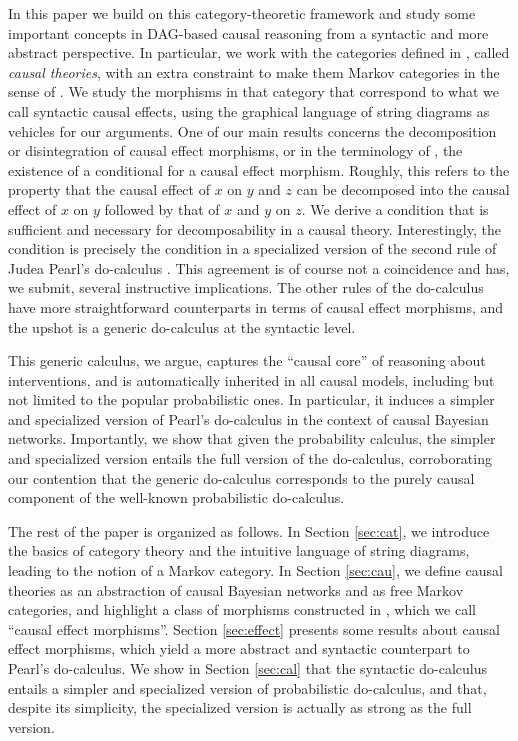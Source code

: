 \documentclass[12pt]{amsart}
\theoremstyle{plain}
\theoremstyle{definition}
\theoremstyle{remark}
\numberwithin{equation}{section}
\theoremstyle{plain}
\newcommand{\0}{\emptyset}
\begin{document}
In this paper we build on this category-theoretic framework and study some important concepts in DAG-based causal reasoning from a syntactic and more abstract perspective. In particular, we work with the categories defined in \cite{Fong:thesis}, called {\it causal theories}, with an extra constraint to make them Markov categories in the sense of \cite{fritz2020synthetic}. We study the morphisms in that category that correspond to what we call syntactic causal effects, using the graphical language of string diagrams as vehicles for our arguments. One of our main results concerns the decomposition or disintegration of causal effect morphisms, or in the terminology of \cite{fritz2020synthetic}, the existence of a conditional for a causal effect morphism. Roughly, this refers to the property that the causal effect of $x$ on $y$ and $z$ can be decomposed into the causal effect of $x$ on $y$ followed by that of $x$ and $y$ on $z$. We derive a condition that is sufficient and necessary for decomposability in a causal theory.  Interestingly, the condition is precisely the condition in a specialized version of the second rule of Judea Pearl's do-calculus \cite{pearl2009causality}. This agreement is of course not a coincidence and has, we submit, several instructive implications. The other rules of the do-calculus have more straightforward counterparts in terms of causal effect morphisms, and the upshot is a generic do-calculus at the syntactic level.

This generic calculus, we argue, captures the ``causal core'' of reasoning about interventions, and is automatically inherited in all causal models, including but not limited to the popular probabilistic ones. In particular, it induces a simpler and specialized version of Pearl's do-calculus in the context of causal Bayesian networks. Importantly, we show that given the probability calculus, the simpler and specialized version entails the full version of the do-calculus, corroborating our contention that the generic do-calculus corresponds to the purely causal component of the well-known probabilistic do-calculus.

The rest of the paper is organized as follows. In Section \ref{sec:cat}, we introduce the basics of category theory and the intuitive language of string diagrams, leading to the notion of a Markov category. In Section \ref{sec:cau}, we define causal theories as an abstraction of causal Bayesian networks and as free Markov categories, and highlight a class of morphisms constructed in \cite{Fong:thesis}, which we call ``causal effect morphisms''. Section \ref{sec:effect} presents some results about causal effect morphisms, which yield a more abstract and syntactic counterpart to Pearl's do-calculus. We show in Section \ref{sec:cal} that the syntactic do-calculus entails a simpler and specialized version of probabilistic do-calculus, and that, despite its simplicity, the specialized version is actually as strong as the full version.
\end{document}
